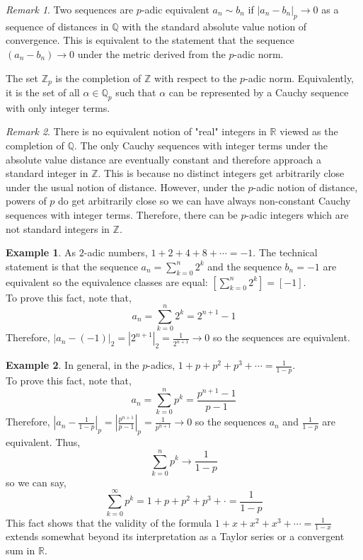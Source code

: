 \documentclass{article}
\newcommand{\Z}{\mathbb{Z}}
\newcommand{\Q}{\mathbb{Q}}
\newcommand{\R}{\mathbb{R}}
\newenvironment{definition}[1][Definition:]{\begin{trivlist}
\item[\hskip \labelsep {\bfseries #1}]}{\end{trivlist}}
\theoremstyle{theorem}
\theoremstyle{definition}
\theoremstyle{definition}
\theoremstyle{remark}
\theoremstyle{definition}
\newtheorem{example}{Example}[section]
\theoremstyle{remark}
\newtheorem{remark}{Remark}[subsection]
\begin{document}
\begin{remark}
Two sequences are $p$-adic equivalent $a_n \sim b_n$ if $|a_n - b_n|_p \to 0$ as a sequence of distances in $\Q$ with the standard absolute value notion of convergence. This is equivalent to the statement that the sequence $(a_n - b_n) \to 0$ under the metric derived from the $p$-adic norm. 
\end{remark}

\begin{definition}
The set $\mathbb{Z}_p$ is the completion of $\mathbb{Z}$ with respect to the $p$-adic norm. Equivalently, it is the set of all $\alpha \in \Q_p$ such that $\alpha$ can be represented by a Cauchy sequence with only integer terms. 
\end{definition}

\begin{remark}
There is no equivalent notion of "real" integers in $\R$ viewed as the completion of $\Q$. The only Cauchy sequences with integer terms under the absolute value distance are eventually constant and therefore approach a standard integer in $\Z$. This is because no distinct integers get arbitrarily close under the usual notion of distance. However, under the $p$-adic notion of distance, powers of $p$ do get arbitrarily close so we can have always non-constant Cauchy sequences with integer terms. Therefore, there can be $p$-adic integers which are not standard integers in $\Z$.      
\end{remark}


\begin{example} 
As $2$-adic numbers, $1 + 2 + 4 + 8 + \cdots = -1$. The technical statement is that the sequence $a_n = \sum_{k = 0}^{n} 2^k$ and the sequence $b_n = -1$ are equivalent so the equivalence classes are equal: $\left[\sum_{k = 0}^{n} 2^k \right] = [-1]$. \\ To prove this fact, note that,
\[a_n = \sum_{k = 0}^{n} 2^k = 2^{n+1} - 1\]
Therefore, $|a_n - (-1)|_2 = |2^{n+1}|_2 = \frac{1}{2^{n+1}} \to 0$ so the sequences are equivalent. 
\end{example}

\begin{example} 
In general, in the $p$-adics, $1 + p + p^2 + p^3 + \cdots = \frac{1}{1 - p}$.  \\ To prove this fact, note that,
\[a_n = \sum_{k = 0}^{n} p^k = \frac{p^{n+1} - 1}{p - 1}\]
Therefore, $|a_n - \frac{1}{1-p}|_p = |\frac{p^{n+1}}{p-1}|_p = \frac{1}{p^{n+1}} \to 0$ so the sequences $a_n$ and $\frac{1}{1-p}$ are equivalent. Thus, 
\[ \sum_{k = 0}^{n} p^k \to \frac{1}{1-p}\] so we can say,
\[\sum_{k = 0}^{\infty} p^k = 1 + p + p^2 + p^3 + \cdot = \frac{1}{1 - p} \]
This fact shows that the validity of the formula $1 + x + x^2 + x^3 + \cdots = \frac{1}{1 - x}$ extends somewhat beyond its interpretation as a Taylor series or a convergent sum in $\R$. 
\end{example}
\end{document}
